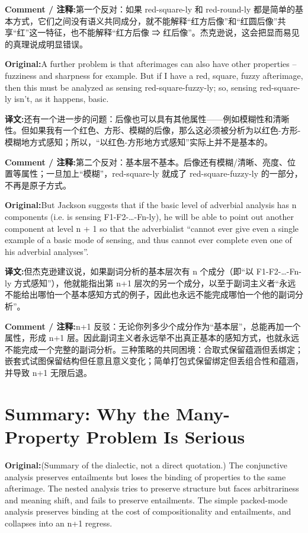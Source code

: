 \documentclass[11pt,a4paper]{article}
\newcommand{\eng}[1]{\begin{engbox}\noindent\textbf{Original:}\quad #1\end{engbox}}
\newcommand{\cn}[1]{\begin{cnbox}\noindent\textbf{译文:}\quad #1\end{cnbox}}
\newcommand{\cmt}[1]{\begin{commentbox}\noindent\textbf{Comment / 注释:}\quad #1\end{commentbox}}
\begin{document}
\cmt{第一个反对：如果 red-square-ly 和 red-round-ly 都是简单的基本方式，它们之间没有语义共同成分，就不能解释“红方后像”和“红圆后像”共享“红”这一特征，也不能解释“红方后像 ⇒ 红后像”。杰克逊说，这会把显而易见的真理说成明显错误。}

\eng{A further problem is that afterimages can also have other properties – fuzziness and sharpness for example. But if I have a red, square, fuzzy afterimage, then this must be analyzed as sensing red-square-fuzzy-ly; so, sensing red-square-ly isn’t, as it happens, basic.}

\cn{还有一个进一步的问题：后像也可以具有其他属性——例如模糊性和清晰性。但如果我有一个红色、方形、模糊的后像，那么这必须被分析为以红色-方形-模糊地方式感知；所以，“以红色-方形地方式感知”实际上并不是基本的。}

\cmt{第二个反对：基本层不基本。后像还有模糊/清晰、亮度、位置等属性；一旦加上“模糊”，red-square-ly 就成了 red-square-fuzzy-ly 的一部分，不再是原子方式。}

\eng{But Jackson suggests that if the basic level of adverbial analysis has n components (i.e. is sensing F1-F2-…-Fn-ly), he will be able to point out another component at level n + 1 so that the adverbialist “cannot ever give even a single example of a basic mode of sensing, and thus cannot ever complete even one of his adverbial analyses”.}

\cn{但杰克逊建议说，如果副词分析的基本层次有 n 个成分（即“以 F1-F2-…-Fn-ly 方式感知”），他就能指出第 n+1 层次的另一个成分，以至于副词主义者“永远不能给出哪怕一个基本感知方式的例子，因此也永远不能完成哪怕一个他的副词分析”。}

\cmt{n+1 反驳：无论你列多少个成分作为“基本层”，总能再加一个属性，形成 n+1 层。因此副词主义者永远举不出真正基本的感知方式，也就永远不能完成一个完整的副词分析。三种策略的共同困境：合取式保留蕴涵但丢绑定；嵌套式试图保留结构但任意且意义变化；简单打包式保留绑定但丢组合性和蕴涵，并导致 n+1 无限后退。}

\section{Summary: Why the Many-Property Problem Is Serious}

\eng{(Summary of the dialectic, not a direct quotation.) The conjunctive analysis preserves entailments but loses the binding of properties to the same afterimage. The nested analysis tries to preserve structure but faces arbitrariness and meaning shift, and fails to preserve entailments. The simple packed-mode analysis preserves binding at the cost of compositionality and entailments, and collapses into an n+1 regress.}
\end{document}
